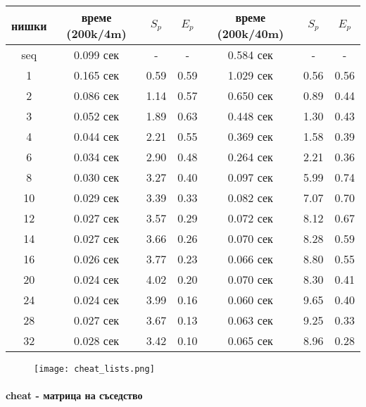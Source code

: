 \begin{center}
\begin{tabular}{ c | c c c | c c c | }
  нишки & време (200k/4m) & $S_p$ & $E_p$ & време (200k/40m) & $S_p$ & $E_p$ \\
  \hline
  seq & 0.099 сек & - & - & 0.584 сек & - & - \\
  1  & 0.165 сек & 0.59 & 0.59 & 1.029 сек & 0.56 & 0.56 \\
  2  & 0.086 сек & 1.14 & 0.57 & 0.650 сек & 0.89 & 0.44 \\
  3  & 0.052 сек & 1.89 & 0.63 & 0.448 сек & 1.30 & 0.43 \\
  4  & 0.044 сек & 2.21 & 0.55 & 0.369 сек & 1.58 & 0.39 \\
  6  & 0.034 сек & 2.90 & 0.48 & 0.264 сек & 2.21 & 0.36 \\
  8  & 0.030 сек & 3.27 & 0.40 & 0.097 сек & 5.99 & 0.74 \\
  10 & 0.029 сек & 3.39 & 0.33 & 0.082 сек & 7.07 & 0.70 \\
  12 & 0.027 сек & 3.57 & 0.29 & 0.072 сек & 8.12 & 0.67 \\
  14 & 0.027 сек & 3.66 & 0.26 & 0.070 сек & 8.28 & 0.59 \\
  16 & 0.026 сек & 3.77 & 0.23 & 0.066 сек & 8.80 & 0.55 \\
  20 & 0.024 сек & 4.02 & 0.20 & 0.070 сек & 8.30 & 0.41 \\
  24 & 0.024 сек & 3.99 & 0.16 & 0.060 сек & 9.65 & 0.40 \\
  28 & 0.027 сек & 3.67 & 0.13 & 0.063 сек & 9.25 & 0.33 \\
  32 & 0.028 сек & 3.42 & 0.10 & 0.065 сек & 8.96 & 0.28 \\
\end{tabular}
\end{center}

\begin{figure}[H]
  \centering
  \texttt{[image: cheat\_lists.png]}
\end{figure}

\paragraph*{cheat - матрица на съседство}

